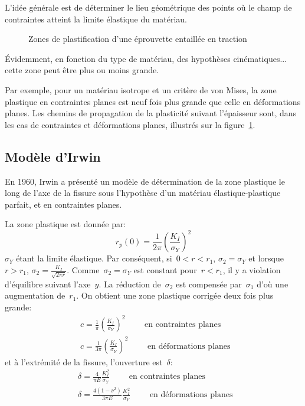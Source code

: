 L'idée générale est de déterminer le lieu géométrique des points où le champ de contraintes atteint la limite élastique du matériau.
\begin{figure}[ht]\centering
{}\hspace{9em}
\caption{Zones de plastification d'une éprouvette entaillée en traction}\label{fig:propagation}
\end{figure}
Évidemment, en fonction du type de matériau, des hypothèses cinématiques... cette zone peut être plus ou moins grande.

\medskip
Par exemple, pour un matériau isotrope et un critère de von Mises, la zone plastique en contraintes planes est neuf fois plus grande que celle en déformations planes.
\medskipvm
Les chemins de propagation de la plasticité suivant l'épaisseur sont, dans les cas de contraintes et déformations planes, illustrés sur la figure~\ref{fig:propagation}.


\medskip
\subsection{Modèle d'Irwin}
En 1960, Irwin a présenté un modèle de détermination de la zone plastique le long de l'axe de la fissure sous l'hypothèse d'un matériau élastique-plastique parfait, et en contraintes planes.

La zone plastique est donnée par:
\begin{equation}r_p(0)=\frac1{2\pi}\left(\frac{K_I}{\sigma_Y}\right)^2
\end{equation}$\sigma_Y$ étant la limite élastique.
Par conséquent, si~$0<r<r_1$, $\sigma_2=\sigma_Y$ et lorsque~$r>r_1$, $\sigma_2=\frac{K_I}{\sqrt{2\pi r}}$.
Comme~$\sigma_2=\sigma_Y$ est constant pour~$r < r_1$, il y a violation d'équilibre suivant l'axe~$y$. 
La réduction de~$\sigma_2$ est compensée par~$\sigma_1$ d'où une augmentation de~$r_1$.
On obtient une zone plastique corrigée deux fois plus grande:
\begin{align}
&c = \frac1\pi\left(\frac{K_I}{\sigma_Y}\right)^2 \qquad \text{ en contraintes planes }\\
&c = \frac1{3\pi}\left(\frac{K_I}{\sigma_Y}\right)^2 \qquad \text{ en déformations planes }
\end{align}
et à l'extrémité de la fissure, l'ouverture est~$\delta$:
\begin{align}
&\delta = \frac4{\pi E}\frac{K_I^2}{\sigma_Y} \qquad \text{ en contraintes planes }\\
&\delta = \frac{4(1-\nu^2)}{3\pi E}\frac{K_I^2}{\sigma_Y} \qquad \text{ en déformations planes }
\end{align}

